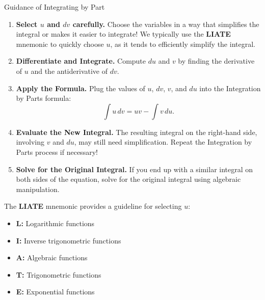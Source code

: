 \documentclass[12pt]{article}
\theoremstyle{beautifulthm}
\begin{document}
\begin{Note}{Guidance of Integrating by Part}{}
\begin{enumerate}
    \item \textbf{Select \( u \) and \( dv \) carefully.} Choose the variables in a way that simplifies the integral or makes it easier to integrate! We typically use the \textbf{LIATE} mnemonic to quickly choose \( u \), as it tends to efficiently simplify the integral.
    
    \item \textbf{Differentiate and Integrate.} Compute \( du \) and \( v \) by finding the derivative of \( u \) and the antiderivative of \( dv \).
    
    \item \textbf{Apply the Formula.} Plug the values of \( u \), \( dv \), \( v \), and \( du \) into the Integration by Parts formula:
    \[
    \int u \, dv = uv - \int v \, du.
    \]

    \item \textbf{Evaluate the New Integral.} The resulting integral on the right-hand side, involving \( v \) and \( du \), may still need simplification. Repeat the Integration by Parts process if necessary!
    
    \item \textbf{Solve for the Original Integral.} If you end up with a similar integral on both sides of the equation, solve for the original integral using algebraic manipulation.
\end{enumerate}
\end{Note}

\begin{tcolorbox}[colback=blue!5!white, colframe=blue!75!black, title=\textbf{LIATE Mnemonic}]
The \textbf{LIATE} mnemonic provides a guideline for selecting \( u \):
\begin{itemize}
    \item \textbf{L:} Logarithmic functions
    \item \textbf{I:} Inverse trigonometric functions
    \item \textbf{A:} Algebraic functions
    \item \textbf{T:} Trigonometric functions
    \item \textbf{E:} Exponential functions
\end{itemize}
\end{tcolorbox}
\end{document}
